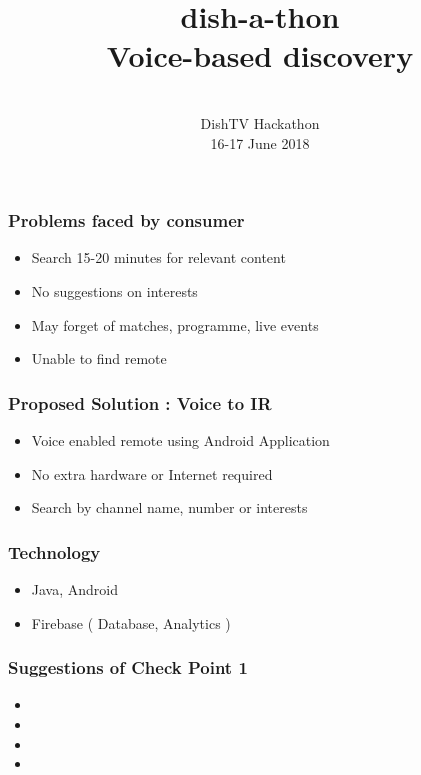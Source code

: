 \documentclass[17pt]{beamer}
\begin{document}
\sffamily \bfseries
 \title
[ \hspace{1 cm} Voice-based discovery ]
{dish-a-thon\\Voice-based discovery}
\author
[  SQUARE \hspace{2 cm} ]
{%
\small 
      \\ DishTV Hackathon
      \\ [0.4 cm]
{\small 16-17 June 2018} \\[2.8cm]
}
\begin{frame}
\titlepage
\end{frame}

\begin{frame}
\frametitle{Problems faced by consumer} \pause
\begin{itemize}[<+-|alert@+>]
\item Search 15-20 minutes for relevant content
\item No suggestions on interests
\item May forget of matches, programme, live events
\item Unable to find remote
\end{itemize}
\end{frame}

\begin{frame}
\frametitle{Proposed Solution : Voice to IR} \pause
\begin{itemize}[<+-|alert@+>]
\item Voice enabled remote using Android Application
\item No extra hardware or Internet required
\item Search by channel name, number or interests  
\end{itemize}
\end{frame}

\begin{frame}

\frametitle{Technology} \pause

\begin{itemize}
[<+-|alert@+>]
\item Java, Android
\item Firebase ( Database, Analytics )

\end{itemize}
\end{frame}

\begin{frame}
\frametitle{Suggestions of Check Point 1} \pause
\begin{itemize}[<+-|alert@+>]
\item 
\item 
\item 
\item 
\end{itemize}
\end{frame}
\end{document}
